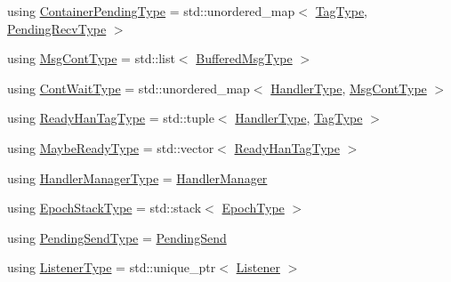\begin{DoxyCompactItemize}
using \hyperlink{structvt_1_1messaging_1_1_active_messenger_a388e97eeb72592e57551e045b43bcfde}{Container\+Pending\+Type} = std\+::unordered\+\_\+map$<$ \hyperlink{namespacevt_a84ab281dae04a52a4b243d6bf62d0e52}{Tag\+Type}, \hyperlink{structvt_1_1messaging_1_1_active_messenger_add1d7ab7bf168d53dfe7b93f29f64f02}{Pending\+Recv\+Type} $>$
\item 
using \hyperlink{structvt_1_1messaging_1_1_active_messenger_a18bbfbf9ecd82b33f6fc475b2e5290a5}{Msg\+Cont\+Type} = std\+::list$<$ \hyperlink{structvt_1_1messaging_1_1_active_messenger_a80a9cbda399d7bf035bfcecc761f4b02}{Buffered\+Msg\+Type} $>$
\item 
using \hyperlink{structvt_1_1messaging_1_1_active_messenger_a1c52f4ec0c93821191cb3e69dc7c8604}{Cont\+Wait\+Type} = std\+::unordered\+\_\+map$<$ \hyperlink{namespacevt_af64846b57dfcaf104da3ef6967917573}{Handler\+Type}, \hyperlink{structvt_1_1messaging_1_1_active_messenger_a18bbfbf9ecd82b33f6fc475b2e5290a5}{Msg\+Cont\+Type} $>$
\item 
using \hyperlink{structvt_1_1messaging_1_1_active_messenger_a98bb74aa4a561161dd7c7073dcd5f1d3}{Ready\+Han\+Tag\+Type} = std\+::tuple$<$ \hyperlink{namespacevt_af64846b57dfcaf104da3ef6967917573}{Handler\+Type}, \hyperlink{namespacevt_a84ab281dae04a52a4b243d6bf62d0e52}{Tag\+Type} $>$
\item 
using \hyperlink{structvt_1_1messaging_1_1_active_messenger_a745d5e8cad8c2f67d20479afacc6e134}{Maybe\+Ready\+Type} = std\+::vector$<$ \hyperlink{structvt_1_1messaging_1_1_active_messenger_a98bb74aa4a561161dd7c7073dcd5f1d3}{Ready\+Han\+Tag\+Type} $>$
\item 
using \hyperlink{structvt_1_1messaging_1_1_active_messenger_ac7e9165df6550ea333f8eb018a5a0e60}{Handler\+Manager\+Type} = \hyperlink{structvt_1_1_handler_manager}{Handler\+Manager}
\item 
using \hyperlink{structvt_1_1messaging_1_1_active_messenger_a746358029c37dabf2b4c8ad26642aee9}{Epoch\+Stack\+Type} = std\+::stack$<$ \hyperlink{namespacevt_a985a5adf291c34a3ca263b3378388236}{Epoch\+Type} $>$
\item 
using \hyperlink{structvt_1_1messaging_1_1_active_messenger_a3626a6ca76d8ad4ec7c3b47a2c70d3a8}{Pending\+Send\+Type} = \hyperlink{structvt_1_1messaging_1_1_pending_send}{Pending\+Send}
\item 
using \hyperlink{structvt_1_1messaging_1_1_active_messenger_a63878fd4ef1fbc505bd1313d32049ca9}{Listener\+Type} = std\+::unique\+\_\+ptr$<$ \hyperlink{structvt_1_1messaging_1_1_listener}{Listener} $>$
\end{DoxyCompactItemize}

